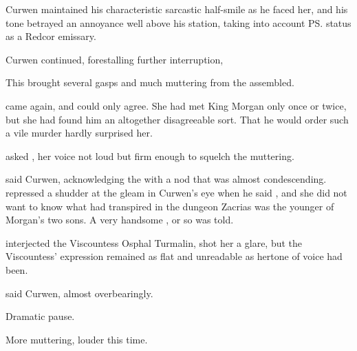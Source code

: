 \begin{garbage}
Curwen maintained his characteristic sarcastic half-smile as he faced her, and his tone betrayed an annoyance well above his station, taking into account \ps{\Vincerre} status as a Redcor emissary. 

 Curwen continued, forestalling further interruption, 

This brought several gasps and much muttering from the assembled. 

 came \Dornaer{} again, and \Tiroco{} could only agree. She had met King Morgan only once or twice, but she had found him an altogether disagreeable sort. That he would order such a vile murder hardly surprised her. 

 asked \Vincerre, her voice not loud but firm enough to squelch the muttering. 


 said Curwen, acknowledging the \mater{} with a nod that was almost condescending. 
%
\dash%
\Tiroco{} repressed a shudder at the gleam in Curwen's eye when he said , and she did not want to know what had transpired in the dungeon%
\dash%
Zacrias was the younger of Morgan's two sons. A very handsome \human, or so \Tiroco{} was told. 


 interjected the Viscountess Osphal Turmalin, 
\Tiroco{} shot her a glare, but the Viscountess' expression remained as flat and unreadable as hertone of voice had been.

 said Curwen, almost overbearingly. 

Dramatic pause. 

More muttering, louder this time. 


\end{garbage}
